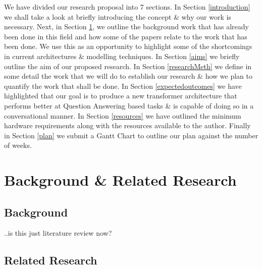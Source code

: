 \documentclass[11pt]{article}
\begin{document}
We have divided our research proposal into 7 sections.
In Section \ref{introduction} we shall take a look at briefly introducing the concept \& why our work is necessary. Next, in Section \ref{backRR}, we outline the background work that has already been done in this field and how some of the papers relate to the work that has been done. We use this as an opportunity to highlight some of the shortcomings in current architectures \& modelling techniques. In Section \ref{aims} we briefly outline the aim of our proposed research. In Section \ref{researchMeth} we define in some detail the work that we will do to establish our research \& how we plan to quantify the work that shall be done. In Section \ref{expectedoutcomes} we have highlighted that our goal is to produce a new transformer architecture that performs better at Question Answering based tasks \& is capable of doing so in a conversational manner.
In Section \ref{resources} we have outlined the minimum hardware requirements along with the resources available to the author. Finally in Section \ref{plan} we submit a Gantt Chart to outline our plan against the number of weeks.


\section{Background \& Related Research}\label{backRR}

\subsection{Background}
..is this just literature review now?
\subsection{Related Research}
\end{document}
